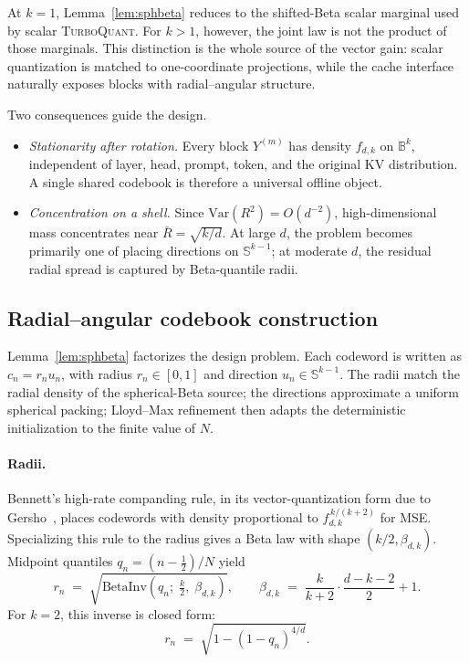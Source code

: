 \documentclass{article}
\theoremstyle{definition}
\theoremstyle{remark}
\newcommand{\bbS}{\mathbb{S}}
\newcommand{\bbB}{\mathbb{B}}
\newcommand{\half}{\tfrac{1}{2}}
\begin{document}
At $k = 1$, Lemma~\ref{lem:sphbeta} reduces to the shifted-Beta
scalar marginal used by scalar \textsc{TurboQuant}.  For $k > 1$,
however, the joint law is not the product of those marginals.  This
distinction is the whole source of the vector gain: scalar
quantization is matched to one-coordinate projections, while the
cache interface naturally exposes blocks with radial--angular
structure.

Two consequences guide the design.
\begin{itemize}
\item[\textbf{(P1)}] \emph{Stationarity after rotation.} Every block
$Y^{(m)}$ has density $f_{d, k}$ on $\bbB^k$, independent of layer,
head, prompt, token, and the original KV distribution.  A single
shared codebook is therefore a universal offline object.
\item[\textbf{(P2)}] \emph{Concentration on a shell.} Since
$\mathrm{Var}(R^2) = O(d^{-2})$, high-dimensional mass concentrates
near $\bar R = \sqrt{k/d}$.  At large $d$, the problem becomes
primarily one of placing directions on $\bbS^{k - 1}$; at moderate
$d$, the residual radial spread is captured by Beta-quantile radii.
\end{itemize}

\subsection{Radial--angular codebook construction}
\label{sec:beta_quantile}

Lemma~\ref{lem:sphbeta} factorizes the design problem.  Each
codeword is written as $c_n = r_n u_n$, with radius $r_n \in [0, 1]$
and direction $u_n \in \bbS^{k - 1}$.  The radii match the radial
density of the spherical-Beta source; the directions approximate a
uniform spherical packing; Lloyd--Max refinement then adapts the
deterministic initialization to the finite value of $N$.

\paragraph{Radii.}
Bennett's high-rate companding rule, in its vector-quantization
form due to Gersho~\citep{gersho1979asymptotic}, places codewords
with density proportional to $f_{d, k}^{\,k/(k + 2)}$ for MSE.
Specializing this rule to the radius gives a Beta law with shape
$(k/2, \beta_{d, k})$.  Midpoint quantiles $q_n = (n - \half)/N$
yield
\begin{equation}
r_n \;=\; \sqrt{\mathrm{BetaInv}\!\left(q_n;\;\tfrac{k}{2},\;\beta_{d, k}\right)},
\qquad
\beta_{d, k} \;=\; \frac{k}{k + 2}\cdot\frac{d - k - 2}{2} + 1.
\label{eq:radii_main}
\end{equation}
For $k = 2$, this inverse is closed form:
\begin{equation}
r_n \;=\; \sqrt{1 - (1 - q_n)^{4/d}}.
\label{eq:radii_k2}
\end{equation}
\end{document}
